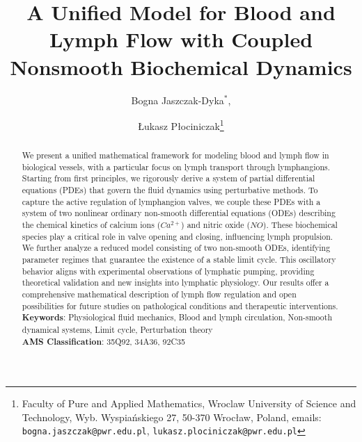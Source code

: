 \documentclass[12pt,a4paper]{article}
\title{A Unified Model for Blood and Lymph Flow with Coupled Nonsmooth Biochemical Dynamics}
\author{
Bogna Jaszczak-Dyka$^*$, \and 
{\L}ukasz P{\l}ociniczak\thanks{Faculty of Pure and Applied Mathematics, Wroclaw University of Science and Technology, Wyb. Wyspia\'nskiego 27, 50-370 Wroc{\l}aw, Poland, emails: \texttt{bogna.jaszczak@pwr.edu.pl}, \texttt{lukasz.plociniczak@pwr.edu.pl}}
}
\date{}
\begin{document}
\maketitle

\begin{abstract}

We present a unified mathematical framework for modeling blood and lymph flow in biological vessels, with a particular focus on lymph transport through lymphangions. Starting from first principles, we rigorously derive a system of partial differential equations (PDEs) that govern the fluid dynamics using perturbative methods. To capture the active regulation of lymphangion valves, we couple these PDEs with a system of two nonlinear ordinary non-smooth differential equations (ODEs) describing the chemical kinetics of calcium ions ($Ca^{2+}$) and nitric oxide ($NO$). These biochemical species play a critical role in valve opening and closing, influencing lymph propulsion. We further analyze a reduced model consisting of two non-smooth ODEs, identifying parameter regimes that guarantee the existence of a stable limit cycle. This oscillatory behavior aligns with experimental observations of lymphatic pumping, providing theoretical validation and new insights into lymphatic physiology. Our results offer a comprehensive mathematical description of lymph flow regulation and open possibilities for future studies on pathological conditions and therapeutic interventions.\\
    
\noindent\textbf{Keywords}: Physiological fluid mechanics, Blood and lymph circulation, Non-smooth dynamical systems, Limit cycle, Perturbation theory\\

\noindent\textbf{AMS Classification}: 35Q92, 34A36, 92C35
\end{abstract}
\end{document}
